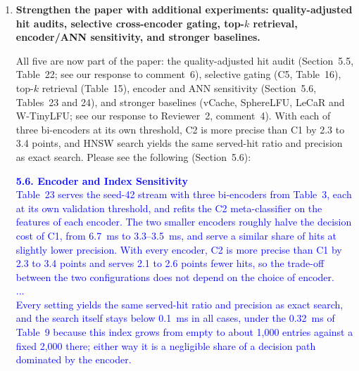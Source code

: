\documentclass[11pt]{article}
\begin{document}
\begin{enumerate}[leftmargin=*, itemsep=1.2em]
\textcolor{blue}{\textbf{5.7. Eviction Policy Evaluation}\\
...\\
To see why semantic retention gains little, Table~27 records the cache contents at every eviction at capacity 400: the number of live entries within the hit radius of the victim, the share of victims whose topic is still covered by another live entry, and the share of victims that were never hit. Redundancy is low under every policy: a victim has on average 0.035--0.056 neighbors within the hit radius, and its topic remains covered in only 1.4--2.2\% of evictions. Between 82\% and 100\% of victims were never hit, so the decision that matters is which of many unrepeated entries to keep, and a score that ranks entries by their proximity to popular requests finds few near-duplicates to separate.}

\item \textbf{Strengthen the paper with additional experiments: quality-adjusted hit audits, selective cross-encoder gating, top-$k$ retrieval, encoder/ANN sensitivity, and stronger baselines.}

All five are now part of the paper: the quality-adjusted hit audit (Section~5.5, Table~22; see our response to comment~6), selective gating (C5, Table~16), top-$k$ retrieval (Table~15), encoder and ANN sensitivity (Section~5.6, Tables~23 and 24), and stronger baselines (vCache, SphereLFU, LeCaR and W-TinyLFU; see our response to Reviewer~2, comment~4). With each of three bi-encoders at its own threshold, C2 is more precise than C1 by 2.3 to 3.4 points, and HNSW search yields the same served-hit ratio and precision as exact search. Please see the following (Section~5.6):

\textcolor{blue}{\textbf{5.6. Encoder and Index Sensitivity}\\
Table~23 serves the seed-42 stream with three bi-encoders from Table~3, each at its own validation threshold, and refits the C2 meta-classifier on the features of each encoder. The two smaller encoders roughly halve the decision cost of C1, from 6.7~ms to 3.3--3.5~ms, and serve a similar share of hits at slightly lower precision. With every encoder, C2 is more precise than C1 by 2.3 to 3.4 points and serves 2.1 to 2.6 points fewer hits, so the trade-off between the two configurations does not depend on the choice of encoder.\\
...\\
Every setting yields the same served-hit ratio and precision as exact search, and the search itself stays below 0.1~ms in all cases, under the 0.32~ms of Table~9 because this index grows from empty to about 1,000 entries against a fixed 2,000 there; either way it is a negligible share of a decision path dominated by the encoder.}


\end{enumerate}
\end{document}
